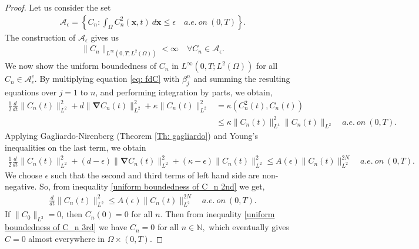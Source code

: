\documentclass[final,3p,times]{elsarticle}
\theoremstyle{plain}
\theoremstyle{remark}
\theoremstyle{plain}
\theoremstyle{remark}
\begin{document}
\begin{proof}
Let us consider the set
\begin{align*}
    \mathscr A_\epsilon = \left\{C_n: \int_\Omega C_n^2(\mathbf x,t)\ d\mathbf x  \le \epsilon \quad  a.e. \ on \ (0,T)\right\}.
\end{align*}
The construction of $\mathscr A_\epsilon$ gives us \begin{align}
    \|C_n\|_{L^\infty(0,T;L^2(\Omega))}<\infty \quad \forall C_n \in \mathscr A_\epsilon.
\end{align}
We now show the uniform boundedness of $C_n$ in $L^\infty(0,T;L^2(\Omega))$ for all $C_n\in \mathscr A_\epsilon^c.$
	By multiplying equation \eqref{eq: fdC} with $\beta_j^n$ and summing the resulting equations over $j=1$ to $ n$, and performing integration by parts, we obtain, 
	\begin{align}
    \frac{1}{2}\frac{d}{dt}\|C_n\left(t\right)\|_{L^2}^2+d\|\boldsymbol{\nabla}{C_n\left(t\right)}\|^2_{L^2}+\kappa \|C_n\left(t\right)\|_{L^2}^2 & =\kappa \left(C_n^2\left(t\right),C_n\left(t\right)\right) \nonumber \\ 
    & \le \kappa\|C_n(t)\|_{L^4}^2\|C_n(t)\|_{L^2} \quad a.e.\  on \ \left(0,T\right). \label{uniform boundedness of C_n 1st}
	\end{align}
Applying Gagliardo-Nirenberg (Theorem \ref{Th: gagliardo}) and Young's inequalities on the last term, we obtain
\begin{align}
    \frac{1}{2}\frac{d}{dt}\|C_n\left(t\right)\|_{L^2}^2+(d-\epsilon)\|\boldsymbol{\nabla}{C_n\left(t\right)}\|^2_{L^2}+(\kappa - \epsilon ) \|C_n\left(t\right)\|_{L^2}^2
    \le A(\epsilon) \|C_n\left(t\right)\|_{L^2}^{2N}\quad a.e.\  on \ \left(0,T\right). \label{uniform boundedness of C_n 2nd}
\end{align}
We choose $\epsilon$ such that the second and third terms of left hand side are non-negative. So, from inequality \eqref{uniform boundedness of C_n 2nd} we get,
\begin{align}
    \frac{d}{dt}\|C_n\left(t\right)\|_{L^2}^2\le  A(\epsilon)\|C_n\left(t\right)\|_{L^2}^{2N}\quad a.e.\  on \ \left(0,T\right). \label{uniform boundedness of C_n 3rd}
\end{align}
If \(\|C_0\|_{L^2} = 0\), then $C_n(0) = 0$ for all $n$. Then from inequality \eqref{uniform boundedness of C_n 3rd} we have $C_n=0$ for all \(n\in \mathds N,\) which eventually gives $C=0$ almost everywhere in \(\Omega\times(0,T)\). 


\end{proof}
\end{document}
